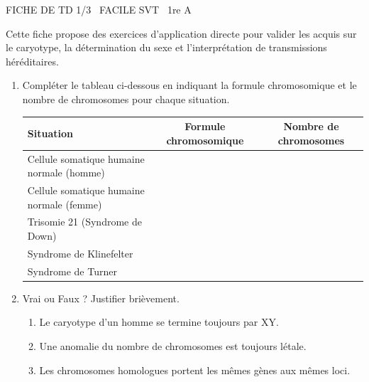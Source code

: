 \documentclass[11pt]{article}
\begin{document}
\begin{tcolorbox}[enhanced,colback=popink,colframe=popink,arc=10pt,boxrule=0pt,left=12pt,right=12pt,top=9pt,bottom=9pt]
{\color{white}\popxbold\small FICHE DE TD 1/3 \textbullet\ FACILE \hfill SVT \textbullet\ 1re A\par}
\end{tcolorbox}
\vspace{4pt}
Cette fiche propose des exercices d'application directe pour valider les acquis sur le caryotype, la détermination du sexe et l'interprétation de transmissions héréditaires.

\begin{exercice}
\begin{enumerate}
    \item Compléter le tableau ci-dessous en indiquant la formule chromosomique et le nombre de chromosomes pour chaque situation.
    \begin{tabular}{|l|c|c|}
    \hline
    \textbf{Situation} & \textbf{Formule chromosomique} & \textbf{Nombre de chromosomes} \\
    \hline
    Cellule somatique humaine normale (homme) &  &  \\
    \hline
    Cellule somatique humaine normale (femme) &  &  \\
    \hline
    Trisomie 21 (Syndrome de Down) &  &  \\
    \hline
    Syndrome de Klinefelter &  &  \\
    \hline
    Syndrome de Turner &  &  \\
    \hline
    \end{tabular}
    \item Vrai ou Faux ? Justifier brièvement.
    \begin{enumerate}
        \item Le caryotype d'un homme se termine toujours par XY.
        \item Une anomalie du nombre de chromosomes est toujours létale.
        \item Les chromosomes homologues portent les mêmes gènes aux mêmes loci.
    \end{enumerate}
\end{enumerate}
\end{exercice}
\end{document}
